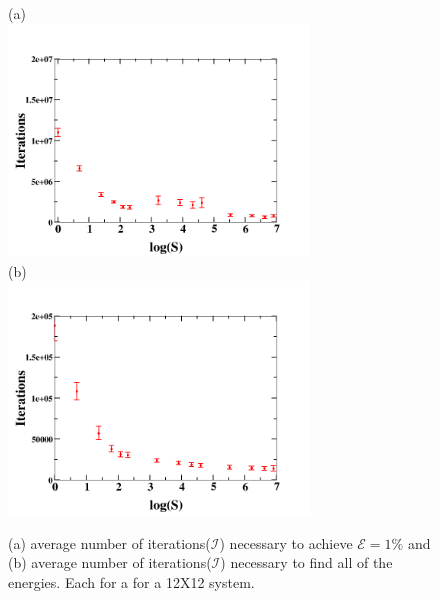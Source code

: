 \documentclass[twocolumn]{article}
\begin{document}
\begin{figure}[h!]
(a)\\
\includegraphics[width=8cm]{its_for_err.png}\\
(b)\\
\includegraphics[width=8cm]{its_to_find.png}\\
\caption{\label{its_to_err} (a) average number of iterations($\mathcal{I}$) necessary to achieve $\mathcal{E}=1\%$ and (b) average number of iterations($\mathcal{I}$) necessary
to find all of the energies. Each for a for a 12X12 system. }
\end{figure}
\end{document}
